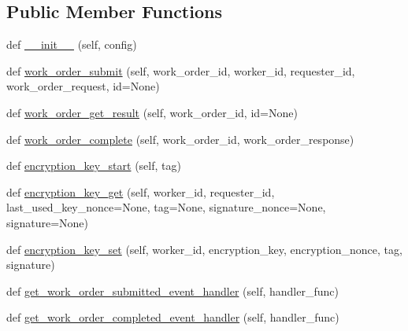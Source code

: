 \subsection*{Public Member Functions}
\begin{DoxyCompactItemize}
\item 
def \hyperlink{classavalon__sdk_1_1connector_1_1blockchains_1_1fabric_1_1fabric__work__order_1_1FabricWorkOrderImpl_a6e413adcfcefd75b0a92d2a4a02cf839}{\+\_\+\+\_\+init\+\_\+\+\_\+} (self, config)
\item 
def \hyperlink{classavalon__sdk_1_1connector_1_1blockchains_1_1fabric_1_1fabric__work__order_1_1FabricWorkOrderImpl_afa47ca30496161f6fe0c60481fd417ee}{work\+\_\+order\+\_\+submit} (self, work\+\_\+order\+\_\+id, worker\+\_\+id, requester\+\_\+id, work\+\_\+order\+\_\+request, id=None)
\item 
def \hyperlink{classavalon__sdk_1_1connector_1_1blockchains_1_1fabric_1_1fabric__work__order_1_1FabricWorkOrderImpl_a7e75472152118a477573eb79282aa1c0}{work\+\_\+order\+\_\+get\+\_\+result} (self, work\+\_\+order\+\_\+id, id=None)
\item 
def \hyperlink{classavalon__sdk_1_1connector_1_1blockchains_1_1fabric_1_1fabric__work__order_1_1FabricWorkOrderImpl_a26bb246b14d731f758208c00b507520a}{work\+\_\+order\+\_\+complete} (self, work\+\_\+order\+\_\+id, work\+\_\+order\+\_\+response)
\item 
def \hyperlink{classavalon__sdk_1_1connector_1_1blockchains_1_1fabric_1_1fabric__work__order_1_1FabricWorkOrderImpl_a140f6966b8884569ee4dbf496e684709}{encryption\+\_\+key\+\_\+start} (self, tag)
\item 
def \hyperlink{classavalon__sdk_1_1connector_1_1blockchains_1_1fabric_1_1fabric__work__order_1_1FabricWorkOrderImpl_a2ed8cad5b78efad2c599499f5615117a}{encryption\+\_\+key\+\_\+get} (self, worker\+\_\+id, requester\+\_\+id, last\+\_\+used\+\_\+key\+\_\+nonce=None, tag=None, signature\+\_\+nonce=None, signature=None)
\item 
def \hyperlink{classavalon__sdk_1_1connector_1_1blockchains_1_1fabric_1_1fabric__work__order_1_1FabricWorkOrderImpl_a443d36efca88213987ee88165b350d46}{encryption\+\_\+key\+\_\+set} (self, worker\+\_\+id, encryption\+\_\+key, encryption\+\_\+nonce, tag, signature)
\item 
def \hyperlink{classavalon__sdk_1_1connector_1_1blockchains_1_1fabric_1_1fabric__work__order_1_1FabricWorkOrderImpl_a92f9079dcaae28f3ed1c0a778e660fd1}{get\+\_\+work\+\_\+order\+\_\+submitted\+\_\+event\+\_\+handler} (self, handler\+\_\+func)
\item 
def \hyperlink{classavalon__sdk_1_1connector_1_1blockchains_1_1fabric_1_1fabric__work__order_1_1FabricWorkOrderImpl_a1cda0ab07bbe921b568e8168f9a58d78}{get\+\_\+work\+\_\+order\+\_\+completed\+\_\+event\+\_\+handler} (self, handler\+\_\+func)
\end{DoxyCompactItemize}
